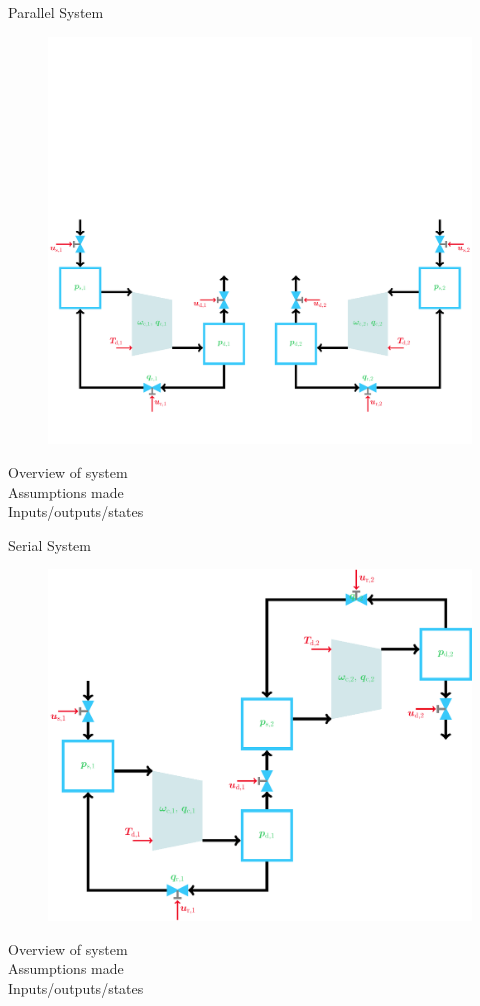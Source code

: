 \begin{frame}{Parallel System}
  \begin{figure}[H]
    \centering
    \includegraphics[width=.8\linewidth,trim={0 0 0 5cm},clip]{figures/parallelcompressor.pdf}
  \end{figure}
  Overview of system\\
  Assumptions made\\
  Inputs/outputs/states
\end{frame}

\begin{frame}{Serial System}
  \begin{figure}[H]
    \centering
    \includegraphics[width=.5\linewidth]{figures/serialcompressor.pdf}
  \end{figure}
  Overview of system\\
  Assumptions made\\
  Inputs/outputs/states
\end{frame}

